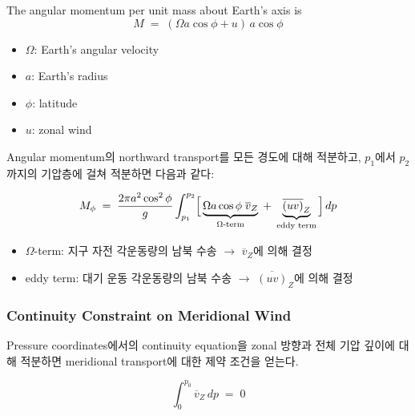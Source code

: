 \begin{definition}

  The angular momentum per unit mass about Earth's axis is
  \begin{equation}\label{eq:ang-mom-ch02}
    M \;=\; (\Omega a\cos\phi + u)\,a\cos\phi
  \end{equation}
  \begin{itemize}
    \item $\Omega$: Earth's angular velocity
    \item $a$: Earth's radius
    \item $\phi$: latitude
    \item $u$: zonal wind
  \end{itemize}
\end{definition}

Angular momentum의 northward transport를 모든 경도에 대해 적분하고,
$p_1$에서 $p_2$까지의 기압층에 걸쳐 적분하면 다음과 같다:

\begin{equation}\label{eq:mom-transport}
  M_\phi \;=\;
  \frac{2\pi a^2\cos^2\phi}{g}
  \int_{p_1}^{p_2}
  \Bigl[\,\underbrace{\Omega a\cos\phi\;\overline{v}_Z}_{\text{$\Omega$-term}}
  \;+\; \underbrace{\overline{(uv)}_Z}_{\text{eddy term}}\,\Bigr]\,dp
\end{equation}

\begin{hisublock}
  \begin{itemize}
    \item $\Omega$-term: 지구 자전 각운동량의 남북 수송 $\to$ $\overline{v}_Z$에 의해 결정
    \item eddy term: 대기 운동 각운동량의 남북 수송 $\to$ $\overline{(uv)}_Z$에 의해 결정
  \end{itemize}
\end{hisublock}

\subsubsection*{Continuity Constraint on Meridional Wind}

Pressure coordinates에서의 continuity equation을 zonal 방향과 전체
기압 깊이에 대해 적분하면 meridional transport에 대한 제약 조건을 얻는다.

\begin{proposition}\label{prop:mass-balance}

  \begin{equation}\label{eq:vz-integral}
    \int_0^{p_0} \overline{v}_Z\,dp \;=\; 0
  \end{equation}
\end{proposition}


